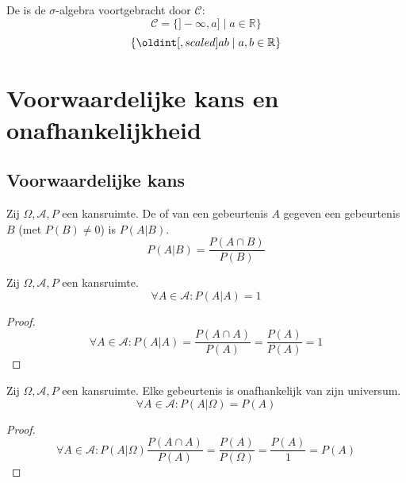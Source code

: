 \documentclass[main.tex]{subfiles}
\begin{document}
\begin{de}
  De  is de $\sigma$-algebra voortgebracht door $\mathcal{C}$:
  \[ \mathcal{C} = \{ ]-\infty,a] \mid a \in \mathbb{R} \} \]  
  \[ \{ \interval{a}{b} \mid a,b\in \mathbb{R} \} \]  
\end{de}


\section{Voorwaardelijke kans en onafhankelijkheid}
\label{sec:voorwaardelijke-kans-en-onafhankelijkheid}

\subsection{Voorwaardelijke kans}
\label{sec:voorwaardelijke-kans}

\begin{de}
  \label{de:voorwaardelijke-kans} 
  Zij $\Omega,\mathcal{A},P$ een kansruimte.
  De  of  van een gebeurtenis $A$ gegeven een gebeurtenis $B$ (met $P(B) \neq 0$) is $P(A|B)$.
  \[ P(A|B) = \frac{P(A\cap B)}{P(B)} \]
\end{de}

\begin{ei}
  Zij $\Omega,\mathcal{A},P$ een kansruimte.
  \[ \forall A \in \mathcal{A}: P(A|A) = 1 \]

  \begin{proof}
    \[ \forall A \in \mathcal{A}: P(A|A) = \frac{P(A \cap A)}{P(A)} = \frac{P(A)}{P(A)} = 1 \]
  \end{proof}
\end{ei}

\begin{ei}
  \label{ei:gebeurtenis onafhankelijk van universum}
  Zij $\Omega,\mathcal{A},P$ een kansruimte.
  Elke gebeurtenis is onafhankelijk van zijn universum.
  \[ \forall A \in \mathcal{A}: P(A|\Omega) = P(A) \]

  \begin{proof}
    \[ \forall A \in \mathcal{A}: P(A|\Omega) \frac{P(A \cap A)}{P(A)} = \frac{P(A)}{P(\Omega)} = \frac{P(A)}{1} = P(A)\]
  \end{proof}
\end{ei}
\end{document}
